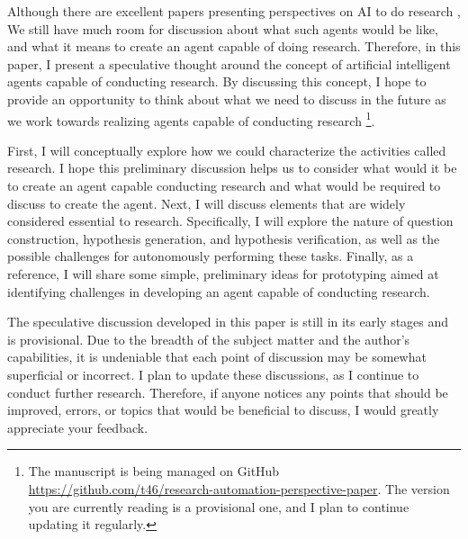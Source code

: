 
Although there are excellent papers presenting perspectives on AI to do research \cite{zenil2023future,coley2020autonomous,coley2020autonomousII,kitano2021nobel,wang2023scientific,zenil2023,zhang2023artificial,hope2022computational}, We still have much room for discussion about what such agents would be like, and what it means to create an agent capable of doing research. Therefore, in this paper, I present a speculative thought around the concept of artificial intelligent agents capable of conducting research. By discussing this concept, I hope to provide an opportunity to think about what we need to discuss in the future as we work towards realizing agents capable of conducting research \footnote{
The manuscript is being managed on GitHub \url{https://github.com/t46/research-automation-perspective-paper}. The version you are currently reading is a provisional one, and I plan to continue updating it regularly.
}. 

First, I will conceptually explore how we could characterize the activities called research. I hope this preliminary discussion helps us to consider what would it be to create an agent capable conducting research and what would be required to discuss to create the agent. Next, I will discuss elements that are widely considered essential to research. Specifically, I will explore the nature of question construction, hypothesis generation, and hypothesis verification, as well as the possible challenges for autonomously performing these tasks. Finally, as a reference, I will share some simple, preliminary ideas for prototyping aimed at identifying challenges in developing an agent capable of conducting research.

The speculative discussion developed in this paper is still in its early stages and is provisional. Due to the breadth of the subject matter and the author's capabilities, it is undeniable that each point of discussion may be somewhat superficial or incorrect. I plan to update these discussions, as I continue to conduct further research. Therefore, if anyone notices any points that should be improved, errors, or topics that would be beneficial to discuss, I would greatly appreciate your feedback.

